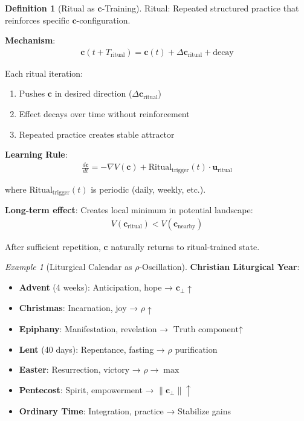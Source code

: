 \documentclass[11pt,a4paper]{article}
\theoremstyle{definition}
\newtheorem{definition}{Definition}[section]
\theoremstyle{remark}
\newtheorem{example}{Example}[section]
\newcommand{\cc}{\mathbf{c}}
\begin{document}
\begin{enumerate}
\begin{protocol}
\begin{definition}[Ritual as \(\cc\)-Training]
Ritual: Repeated structured practice that reinforces specific \(\cc\)-configuration.

\textbf{Mechanism}:
\begin{align}
\cc(t + T_{\text{ritual}}) = \cc(t) + \Delta\cc_{\text{ritual}} + \text{decay}
\end{align}

Each ritual iteration:
\begin{enumerate}
    \item Pushes \(\cc\) in desired direction (\(\Delta\cc_{\text{ritual}}\))
    \item Effect decays over time without reinforcement
    \item Repeated practice creates stable attractor
\end{enumerate}

\textbf{Learning Rule}:
\begin{align}
\frac{d\cc}{dt} = -\nabla V(\cc) + \text{Ritual}_{\text{trigger}}(t) \cdot \mathbf{u}_{\text{ritual}}
\end{align}

where \(\text{Ritual}_{\text{trigger}}(t)\) is periodic (daily, weekly, etc.).

\textbf{Long-term effect}: Creates local minimum in potential landscape:
\begin{align}
V(\cc_{\text{ritual}}) < V(\cc_{\text{nearby}})
\end{align}

After sufficient repetition, \(\cc\) naturally returns to ritual-trained state.
\end{definition}

\begin{example}[Liturgical Calendar as \(\rho\)-Oscillation]
\textbf{Christian Liturgical Year}:
\begin{itemize}
    \item \textbf{Advent} (4 weeks): Anticipation, hope → \(\cc_\perp \uparrow\)
    \item \textbf{Christmas}: Incarnation, joy → \(\rho \uparrow\)
    \item \textbf{Epiphany}: Manifestation, revelation → \(\text{Truth component} \uparrow\)
    \item \textbf{Lent} (40 days): Repentance, fasting → \(\rho\) purification
    \item \textbf{Easter}: Resurrection, victory → \(\rho \to \max\)
    \item \textbf{Pentecost}: Spirit, empowerment → \(\|\cc_\perp\| \uparrow\)
    \item \textbf{Ordinary Time}: Integration, practice → Stabilize gains
\end{itemize}


\end{example}
\end{protocol}
\end{enumerate}
\end{document}

